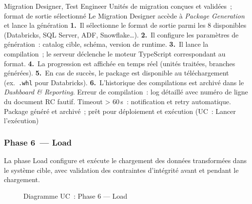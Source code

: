   {Migration Designer, Test Engineer}
  {Unités de migration conçues et validées~; format de sortie sélectionné}
  {Le Migration Designer accède à \textit{Package Generation} et lance la génération}
  {\textbf{1.}~Il sélectionne le format de sortie parmi les 8 disponibles (Databricks, SQL Server, ADF, Snowflake\ldots).\newline
   \textbf{2.}~Il configure les paramètres de génération~: catalog cible, schéma, version de runtime.\newline
   \textbf{3.}~Il lance la compilation~; le serveur déclenche le moteur TypeScript correspondant au format.\newline
   \textbf{4.}~La progression est affichée en temps réel (unités traitées, branches générées).\newline
   \textbf{5.}~En cas de succès, le package est disponible au téléchargement (ex.~\texttt{.whl} pour Databricks).\newline
   \textbf{6.}~L'historique des compilations est archivé dans le \textit{Dashboard \& Reporting}.}
  {Erreur de compilation~: log détaillé avec numéro de ligne du document RC fautif. Timeout > 60\,s~: notification et retry automatique.}
  {Package généré et archivé~; prêt pour déploiement et exécution (UC~: Lancer l'exécution)}

\iffalse %
\subsubsection*{Phase 6~--- Load}
\label{subsubsec:uc-phase6}

La phase Load configure et exécute le chargement des données transformées dans le système cible, avec validation des contraintes d'intégrité avant et pendant le chargement.

\begin{figure}[H]
\centering
{}
\caption{Diagramme UC~: Phase 6 — Load}
\label{fig:uc-phase6}
\end{figure}

